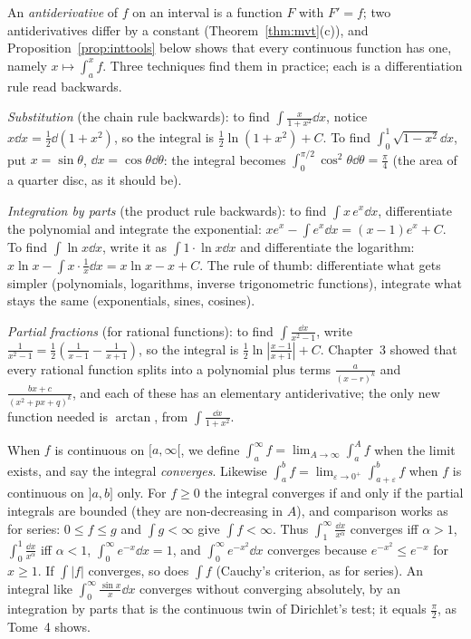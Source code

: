 \begin{examplex}
An \emph{antiderivative} of $f$ on an interval is a function $F$ with $F'=f$; two antiderivatives differ by a constant (Theorem~\ref{thm:mvt}(c)), and
Proposition~\ref{prop:inttools} below shows that every continuous function has one, namely $x\mapsto\int_a^xf$. Three techniques find them in practice; each is a
differentiation rule read backwards.

\emph{Substitution} (the chain rule backwards): to find $\int\frac{x}{1+x^2}\dd x$, notice $x\dd x=\frac12\dd(1+x^2)$, so the integral is $\frac12\ln(1+x^2)+C$. To find $\int_0^1\sqrt{1-x^2}\dd x$, put $x=\sin\theta$, $\dd x=\cos\theta\dd\theta$: the integral becomes $\int_0^{\pi/2}\cos^2\theta\dd\theta=\frac\pi4$ (the area of a quarter disc, as it should be).

\emph{Integration by parts} (the product rule backwards): to find $\int x\,e^x\dd x$, differentiate the polynomial and integrate the exponential: $xe^x-\int e^x\dd x=(x-1)e^x+C$. To find $\int\ln x\dd x$, write it as $\int1\cdot\ln x\dd x$ and differentiate the logarithm: $x\ln x-\int x\cdot\frac1x\dd x=x\ln x-x+C$. The rule of thumb: differentiate what gets simpler (polynomials, logarithms, inverse trigonometric functions), integrate what stays the same (exponentials, sines, cosines).

\emph{Partial fractions} (for rational functions): to find $\int\frac{\dd x}{x^2-1}$, write $\frac1{x^2-1}=\frac12\left(\frac1{x-1}-\frac1{x+1}\right)$, so the integral is $\frac12\ln\left|\frac{x-1}{x+1}\right|+C$. Chapter~3 showed that every rational function splits into a polynomial plus terms $\frac{a}{(x-r)^k}$ and $\frac{bx+c}{(x^2+px+q)^k}$, and each of these has an elementary antiderivative; the only new function needed is $\arctan$, from $\int\frac{\dd x}{1+x^2}$.
\end{examplex}

\begin{reminder}
When $f$ is continuous on $[a,\infty[$, we define $\int_a^\infty f=\lim_{A\to\infty}\int_a^Af$ when the limit exists, and say the integral \emph{converges}. Likewise $\int_a^bf=\lim_{\varepsilon\to0^+}\int_{a+\varepsilon}^bf$ when $f$ is continuous on $]a,b]$ only. For $f\ge0$ the integral converges if and only if the partial integrals are bounded (they are non-decreasing in $A$), and comparison works as for series: $0\le f\le g$ and $\int g<\infty$ give $\int f<\infty$. Thus $\int_1^\infty\frac{\dd x}{x^\alpha}$ converges iff $\alpha>1$, $\int_0^1\frac{\dd x}{x^\alpha}$ iff $\alpha<1$, $\int_0^\infty e^{-x}\dd x=1$, and $\int_0^\infty e^{-x^2}\dd x$ converges because $e^{-x^2}\le e^{-x}$ for $x\ge1$. If $\int|f|$ converges, so does $\int f$ (Cauchy's criterion, as for series). An integral like $\int_0^\infty\frac{\sin x}x\dd x$ converges without converging absolutely, by an integration by parts that is the continuous twin of Dirichlet's test; it equals $\frac\pi2$, as Tome~4 shows.
\end{reminder}

